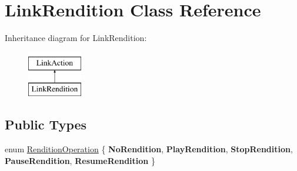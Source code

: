 \hypertarget{class_link_rendition}{}\section{Link\+Rendition Class Reference}
\label{class_link_rendition}
Inheritance diagram for Link\+Rendition\+:\begin{figure}[H]
\begin{center}
\leavevmode
\includegraphics[height=2.000000cm]{class_link_rendition}
\end{center}
\end{figure}
\subsection*{Public Types}
\begin{DoxyCompactItemize}
\item 
enum \hyperlink{class_link_rendition_ab30486eefee99cd4ee5c9d95ad591f5e}{Rendition\+Operation} \{ \newline
{\bfseries No\+Rendition}, 
{\bfseries Play\+Rendition}, 
{\bfseries Stop\+Rendition}, 
{\bfseries Pause\+Rendition}, 
\newline
{\bfseries Resume\+Rendition}
 \}
\end{DoxyCompactItemize}
